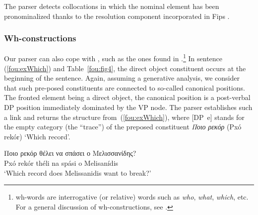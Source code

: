 \documentclass[output=paper]{langsci/langscibook}
\begin{document}
The parser detects collocations in which the nominal element has been pron\-ominalized thanks to the  resolution component incorporated in Fips \citep{wn13}. 


\subsubsection{Wh-constructions}
Our parser can also cope with , such as the ones found in .\footnote{wh-words are interrogative (or relative) words such as \textit{who}, \textit{what}, \textit{which}, etc. For a general discussion of wh-constructions, see \citep{chomsky77}.} In sentence (\ref{fou:exWhich}) %
and Table~\ref{fou:fig4}, the direct object constituent occurs at the beginning of the sentence. Again, assuming a generative  analysis, we consider that such pre-posed constituents are connected to so-called canonical positions. The fronted element being a direct object, the canonical position is a post-verbal DP position immediately dominated by the VP node. The parser establishes such a link and returns the structure from~(\ref{fou:exWhich}), where [DP~e] stands for the empty category (the ``trace'') of the preposed constituent \textit{Ποιο ρεκόρ} (Pxó rekór) `Which record'. 

\ea\label{fou:exWhich}
\gll Ποιο ρεκόρ θέλει να σπάσει ο Μελισσανίδης? \\
Pxó rekór théli na spási o Melisanídis\\
{\small{}      }
\glt `Which record does Melissanidis want to break?'
\z
\end{document}
